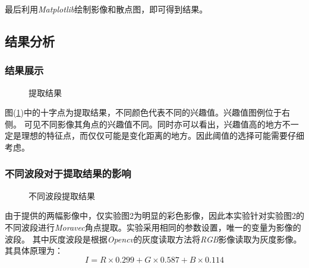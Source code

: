         最后利用\textit{Matplotlib}绘制影像和散点图，即可得到结果。

\subsection{结果分析}
    \subsubsection{结果展示}
        
        \begin{figure}[H]
            \centering
            \caption{提取结果}
            \label{moravec_result}
        \end{figure}
    
        图(\ref{moravec_result})中的十字点为提取结果，不同颜色代表不同的兴趣值。兴趣值图例位于右侧。
        可见不同影像其角点的兴趣值不同。同时亦可以看出，兴趣值高的地方不一定是理想的特征点，而仅仅可能是变化距离的地方。因此阈值的选择可能需要仔细考虑。
    
    \subsubsection{不同波段对于提取结果的影响}
    \begin{figure}[H]
        \centering
        \caption{不同波段提取结果}
        \label{f16rgbg}
    \end{figure}

    由于提供的两幅影像中，仅实验图2为明显的彩色影像，因此本实验针对实验图2的不同波段进行\textit{Moravec}角点提取。实验采用相同的参数设置，唯一的变量为影像的波段。
    其中灰度波段是根据\textit{Opencv}的灰度读取方法将\textit{RGB}影像读取为灰度影像。其具体原理为：
        \begin{equation}
            \label{calgray}
            I=R \times 0.299 + G \times 0.587 + B \times 0.114
        \end{equation}

